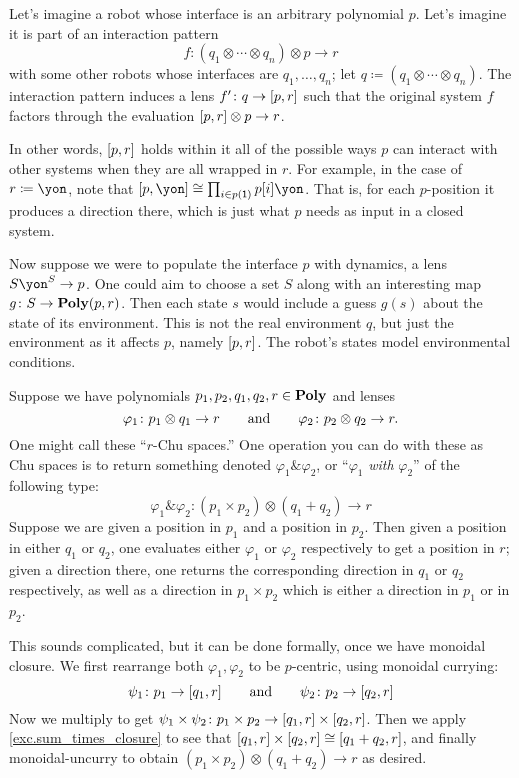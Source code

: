 \documentclass[Book-Poly]{subfiles}
\begin{document}
\begin{example}
Let's imagine a robot whose interface is an arbitrary polynomial $p$. Let's imagine it is part of an interaction pattern
\[
	f\colon (q_1\otimes\cdots\otimes q_n)\otimes p\to r
\]
with some other robots whose interfaces are $q_1,\ldots,q_n$; let $q\coloneqq(q_1\otimes\cdots\otimes q_n)$. The interaction pattern induces a lens $f'\colon q\to [p,r]$ such that the original system $f$ factors through the evaluation $[p,r]\otimes p\to r$.

In other words, $[p,r]$ holds within it all of the possible ways $p$ can interact with other systems when they are all wrapped in $r$.
For example, in the case of $r\coloneqq\yon$, note that $\ihom{p,\yon}\cong\prod_{i\in p(\1)}p[i]\yon$.
That is, for each $p$-position it produces a direction there, which is just what $p$ needs as input in a closed system.

Now suppose we were to populate the interface $p$ with dynamics, a lens $S\yon^S\to p$. One could aim to choose a set $S$ along with an interesting map $g\colon S\to\mathbf{Poly}(p,r)$. Then each state $s$ would include a guess $g(s)$ about the state of its environment. This is not the real environment $q$, but just the environment as it affects $p$, namely $[p,r]$. The robot's states model environmental conditions.
\end{example}

\begin{example}[Chu $\&$]
Suppose we have polynomials $p_1,p_2,q_1,q_2,r\in\mathbf{Poly}$ and lenses
\[
	\varphi_1\colon p_1\otimes q_1\to r
	\qquad\text{and}\qquad
	\varphi_2\colon p_2\otimes q_2\to r.
\]
One might call these ``$r$-Chu spaces.'' One operation you can do with these as Chu spaces is to return something denoted $\varphi_1\&\varphi_2$, or ``$\varphi_1$ \emph{with} $\varphi_2$'' of the following type:
\[
\varphi_1\&\varphi_2\colon (p_1\times p_2)\otimes (q_1+q_2)\to r
\]
Suppose we are given a position in $p_1$ and a position in $p_2$. Then given a position in either $q_1$ or $q_2$, one evaluates either $\varphi_1$ or $\varphi_2$ respectively to get a position in $r$; given a direction there, one returns the corresponding direction in $q_1$ or $q_2$ respectively, as well as a direction in $p_1\times p_2$ which is either a direction in $p_1$ or in $p_2$.

This sounds complicated, but it can be done formally, once we have monoidal closure. We first rearrange both $\varphi_1,\varphi_2$ to be $p$-centric, using monoidal currying:
\[
\psi_1\colon p_1\to [q_1,r]
\qquad\text{and}\qquad
\psi_2\colon p_2\to [q_2,r]
\]
Now we multiply to get $\psi_1\times\psi_2\colon p_1\times p_2\to[q_1,r]\times[q_2,r]$. Then we apply \cref{exc.sum_times_closure} to see that $[q_1,r]\times[q_2,r]\cong[q_1+q_2,r]$, and finally monoidal-uncurry to obtain $(p_1\times p_2)\otimes(q_1+q_2)\to r$ as desired.
\end{example}
\end{document}
